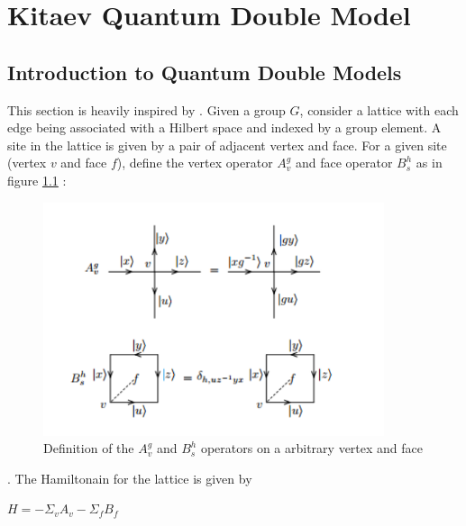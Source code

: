 
\chapter{Kitaev Quantum Double Model} %

\label{Chapter2} %



\section{Introduction to Quantum Double Models}

    This section is heavily inspired by \citep{Reference1}. Given a group $G$, consider a lattice with each edge being associated with a Hilbert space and indexed 
by a group element. A site in the lattice is given by a pair of adjacent vertex and face. For a given site (vertex $v$ and face $f$), define the vertex operator $A^{g}_{v}$ 
and face operator $B^{h}_{s}$ as in figure \ref{fig:A_v_B_p operators} :
\begin{figure}
\centering
\includegraphics[width=10cm]{A_v_B_p.pdf}
\caption[Definition of Vertex, Face operators]{Definition of the $A_{v}^{g}$ and $B_{s}^{h}$ operators on a arbitrary vertex and face}
\centering
\label{fig:A_v_B_p operators}
\end{figure}

. The Hamiltonain for the lattice is given by 
\begin{center}
  $H = -\varSigma_{v} A_{v} - \varSigma_{f} B_{f}$
\end{center}

